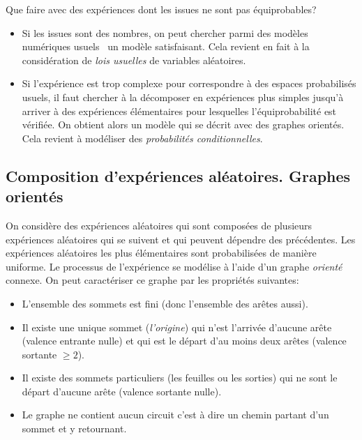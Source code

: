 Que faire avec des expériences dont les issues ne sont pas équiprobables?
\begin{itemize}
  \item Si les issues sont des nombres, on peut chercher parmi des \og modèles numériques usuels\fg~ un modèle satisfaisant. Cela revient en fait à la considération de \emph{lois usuelles} de variables aléatoires.
  \item Si l'expérience est trop complexe pour correspondre à des espaces probabilisés usuels, il faut chercher à la décomposer en expériences plus simples jusqu'à arriver à des expériences élémentaires pour lesquelles l'équiprobabilité est vérifiée. On obtient alors un modèle qui se décrit avec des graphes orientés. Cela revient à modéliser des \emph{probabilités conditionnelles}.
\end{itemize}

\subsection{Composition d'expériences aléatoires. Graphes orientés}
On considère des expériences aléatoires qui sont composées de plusieurs expériences aléatoires qui se suivent et qui peuvent dépendre des précédentes. Les expériences aléatoires les plus élémentaires sont probabilisées de manière uniforme. Le processus de l'expérience se modélise à l'aide d'un graphe \emph{orienté} connexe.\newline
On peut caractériser ce graphe par les propriétés suivantes:
\begin{itemize}
  \item L'ensemble des sommets est fini (donc l'ensemble des arêtes aussi).
  \item Il existe une unique sommet (\emph{l'origine}) qui n'est l'arrivée d'aucune arête (valence entrante nulle) et qui est le départ d'au moins deux arêtes (valence sortante $\geq2$).
  \item Il existe des sommets particuliers (les feuilles ou les sorties) qui ne sont le départ d'aucune arête (valence sortante nulle).
  \item Le graphe ne contient aucun circuit c'est à dire un chemin partant d'un sommet et y retournant.
\end{itemize}

